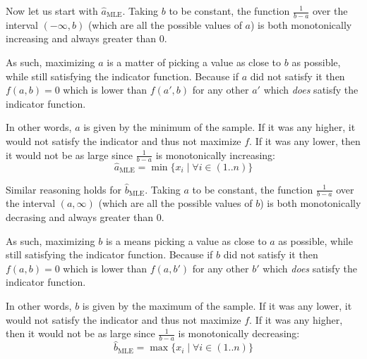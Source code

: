 \documentclass{article}
\begin{document}
Now let us start with $\hat a_{\text{MLE}}$. Taking $b$ to be constant, the function $\frac{1}{b-a}$ over the interval $(-\infty,b)$ (which are all the possible values of $a$) is both monotonically increasing and always greater than 0.
\smallskip

As such, maximizing $a$ is a matter of picking a value as close to $b$ as possible, while still satisfying the indicator function. Because if $a$ did not satisfy it then $f(a,b)=0$ which is lower than $f(a',b)$ for any other $a'$ which \textit{does} satisfy the indicator function.
\smallskip

In other words, $a$ is given by the minimum of the sample. If it was any higher, it would not satisfy the indicator and thus not maximize $f$. If it was any lower, then it would not be as large since $\frac{1}{b-a}$ is monotonically increasing:
$$\hat a_{\text{MLE}}=\min\{x_i\mid \forall i\in(1..n)\}$$
\smallskip

Similar reasoning holds for $\hat b_{\text{MLE}}$. Taking $a$ to be constant, the function $\frac{1}{b-a}$ over the interval $(a,\infty)$ (which are all the possible values of $b$) is both monotonically decrasing and always greater than 0.
\smallskip

As such, maximizing $b$ is a means picking a value as close to $a$ as possible, while still satisfying the indicator function. Because if $b$ did not satisfy it then $f(a,b)=0$ which is lower than $f(a,b')$ for any other $b'$ which \textit{does} satisfy the indicator function.
\smallskip

In other words, $b$ is given by the maximum of the sample. If it was any lower, it would not satisfy the indicator and thus not maximize $f$. If it was any higher, then it would not be as large since $\frac{1}{b-a}$ is monotonically decreasing:
$$\hat b_{\text{MLE}}=\max\{x_i\mid \forall i\in(1..n)\}$$
\end{document}
